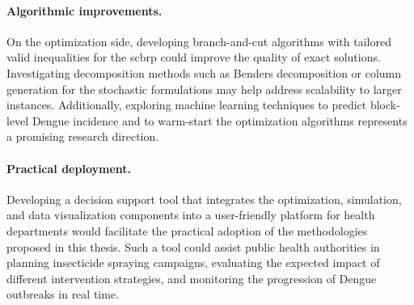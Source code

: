 \paragraph{Algorithmic improvements.}
On the optimization side, developing branch-and-cut algorithms with tailored
valid inequalities for the \gls{scbrp} could improve the quality of exact
solutions. Investigating decomposition methods such as Benders decomposition or
column generation for the stochastic formulations may help address scalability
to larger instances. Additionally, exploring machine learning techniques to
predict block-level Dengue incidence and to warm-start the optimization
algorithms represents a promising research direction.

\paragraph{Practical deployment.}
Developing a decision support tool that integrates the optimization,
simulation, and data visualization components into a user-friendly platform
for health departments would facilitate the practical adoption of the
methodologies proposed in this thesis. Such a tool could assist public health
authorities in planning insecticide spraying campaigns, evaluating the expected
impact of different intervention strategies, and monitoring the progression of
Dengue outbreaks in real time.
